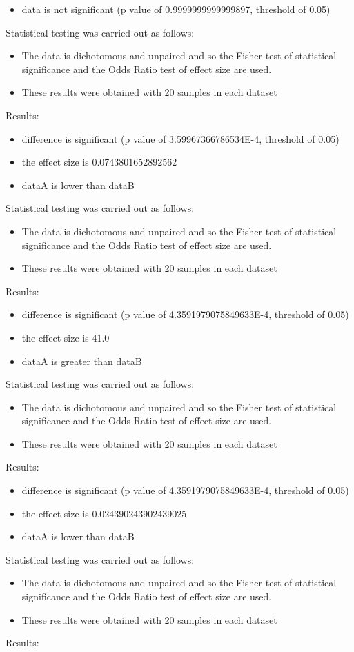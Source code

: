 \documentclass[]{article}
\begin{document}
\begin{itemize}
\item{data is not significant (p value of 0.9999999999999897, threshold of 0.05)}
\end{itemize}Statistical testing was carried out as follows: \begin{itemize}
\item{The data is dichotomous and unpaired and so the Fisher test of statistical significance and the Odds Ratio test of effect size are used.}
\item{These results were obtained with 20 samples in each dataset}
\end{itemize}Results:
\begin{itemize}
\item{difference is significant (p value of 3.59967366786534E-4, threshold of 0.05)}
\item{the effect size is 0.0743801652892562}
\item{dataA is lower than dataB}
\end{itemize}Statistical testing was carried out as follows: \begin{itemize}
\item{The data is dichotomous and unpaired and so the Fisher test of statistical significance and the Odds Ratio test of effect size are used.}
\item{These results were obtained with 20 samples in each dataset}
\end{itemize}Results:
\begin{itemize}
\item{difference is significant (p value of 4.3591979075849633E-4, threshold of 0.05)}
\item{the effect size is 41.0}
\item{dataA is greater than dataB}
\end{itemize}Statistical testing was carried out as follows: \begin{itemize}
\item{The data is dichotomous and unpaired and so the Fisher test of statistical significance and the Odds Ratio test of effect size are used.}
\item{These results were obtained with 20 samples in each dataset}
\end{itemize}Results:
\begin{itemize}
\item{difference is significant (p value of 4.3591979075849633E-4, threshold of 0.05)}
\item{the effect size is 0.024390243902439025}
\item{dataA is lower than dataB}
\end{itemize}Statistical testing was carried out as follows: \begin{itemize}
\item{The data is dichotomous and unpaired and so the Fisher test of statistical significance and the Odds Ratio test of effect size are used.}
\item{These results were obtained with 20 samples in each dataset}
\end{itemize}Results:
\end{document}
